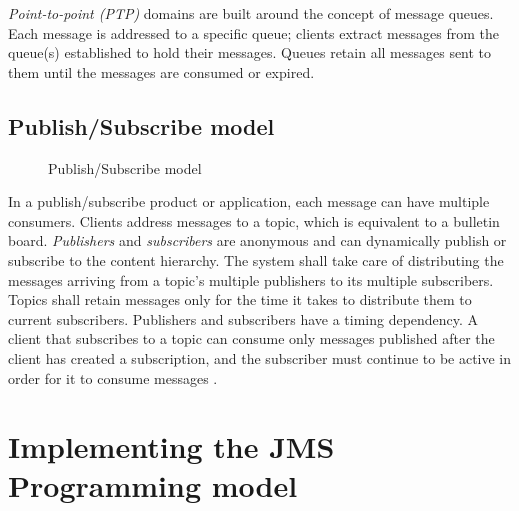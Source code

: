 \documentclass[9pt,twocolumn,twoside]{../../styles/osajnl}
\begin{document}
\emph{Point-to-point (PTP)} domains are built around the concept of
message queues.  Each message is addressed to a specific queue;
clients extract messages from the queue(s) established to hold their
messages. Queues retain all messages sent to them until the messages
are consumed or expired.

\subsection{Publish/Subscribe model}

\begin{figure}[htbp]
\centering
{}
\caption{Publish/Subscribe model \cite{www-jms-tutorialoracle}}
\label{fig: Publish/Subscribe messaging}
\end{figure}

In a publish/subscribe product or application, each message can have
multiple consumers. Clients address messages to a topic, which is
equivalent to a bulletin board. \emph{Publishers} and
\emph{subscribers} are anonymous and can dynamically publish or
subscribe to the content hierarchy. The system shall take care of
distributing the messages arriving from a topic’s multiple publishers
to its multiple subscribers. Topics shall retain messages only for the
time it takes to distribute them to current subscribers.  Publishers
and subscribers have a timing dependency. A client that subscribes to
a topic can consume only messages published after the client has
created a subscription, and the subscriber must continue to be active
in order for it to consume messages \cite{www-jms-tutorialoracle}.


\section{Implementing the JMS Programming model}
\end{document}
